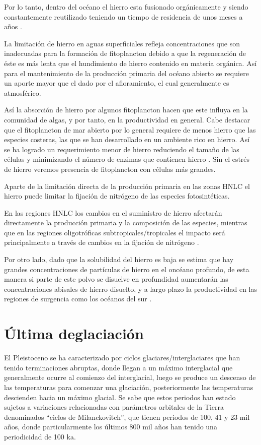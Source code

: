 Por lo tanto, dentro del oc\'eano el hierro esta fusionado org\'anicamente 
y siendo constantemente reutilizado teniendo un tiempo de residencia de unos meses a años \citep{boyd2010biogeochemical}.

La limitaci\'on de hierro en aguas superficiales refleja concentraciones que son inadecuadas para la formaci\'on de fitoplancton debido a que la regeneraci\'on de \'este es m\'as lenta que el 
hundimiento de hierro contenido en materia org\'anica. As\'i para el mantenimiento de la producci\'on primaria del oc\'eano abierto se requiere un aporte mayor que el dado por el afloramiento, el cual generalmente es atmosf\'erico.

As\'i la absorci\'on de hierro por algunos fitoplancton hacen que este influya en la comunidad de algas, y por tanto, en la productividad en general. Cabe destacar que el fitoplancton de mar abierto 
por lo general requiere de menos hierro que las especies costeras, las que se han desarrollado en un ambiente rico en hierro. As\'i se ha logrado un requerimiento menor de hierro reduciendo el tama\~no
de las c\'elulas y minimizando el n\'umero de enzimas que contienen hierro \citep{palenik2003genome}. Sin el estr\'es de hierro veremos presencia de fitoplancton con c\'elulas m\'as grandes. 

Aparte de la limitaci\'on directa de la
producci\'on primaria en las zonas HNLC el hierro puede limitar la fijaci\'on de nitr\'ogeno de las especies fotosint\'eticas. 

En las regiones HNLC los cambios en el suministro de hierro afectar\'an directamente la producci\'on primaria y la composici\'on de las especies, mientras que en las regiones oligotr\'oficas
subtropicales/tropicales el impacto ser\'a principalmente a trav\'es de cambios en la fijaci\'on de nitr\'ogeno \citep{jickells2005global}. 

Por otro lado, dado que la solubilidad del hierro es baja se estima que hay grandes concentraciones de part\'iculas de hierro en el onc\'eano profundo, de esta manera si parte de este polvo se disuelve en profundidad aumentar\'an las concentraciones abisales de hierro disuelto, y a largo plazo la productividad en las regiones de surgencia como 
los oc\'eanos del sur \citep{parekh2005decoupling}. 

\section{Última deglaciación}

El Pleistoceno se ha caracterizado por ciclos glaciares/interglaciares que han tenido terminaciones abruptas, donde llegan a un máximo interglacial que generalmente ocurre al comienzo del interglacial, luego se produce un descenso de las temperaturas para comenzar una glaciación, posteriormente las temperaturas descienden hacia un máximo glacial. Se sabe que estos periodos han estado sujetos a variaciones relacionadas con parámetros orbitales de la Tierra denominados ``ciclos de Milanckovitch'', que tienen periodos de 100, 41 y 23 mil años, donde particularmente los últimos 800 mil años han tenido una periodicidad de 100 ka. 

